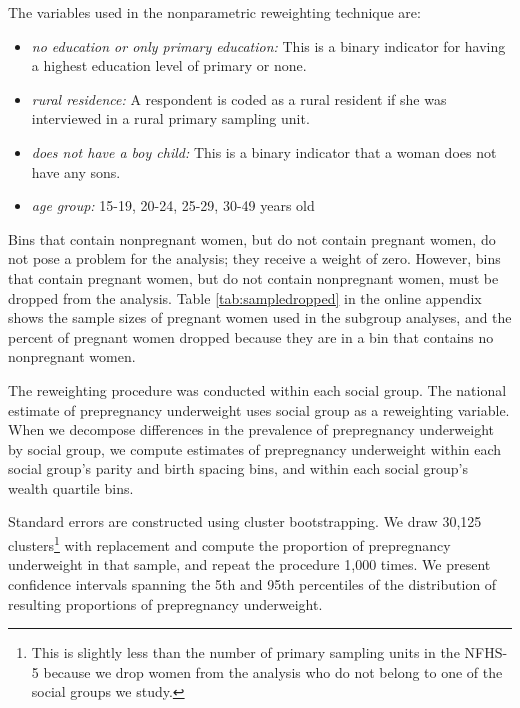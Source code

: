 \documentclass[12pt]{article}
\begin{document}
The variables used in the nonparametric reweighting technique are:
\begin{itemize}
\item \textit{no education or only primary education: } This is a binary indicator for having a highest education level of primary or none. 
\item \textit{rural residence: }
A respondent is coded as a rural resident if she was interviewed in a rural primary sampling unit. 
\item \textit{does not have a boy child: }This is a binary indicator that a woman does not have any sons.
\item \textit{age group:} 15-19, 20-24, 25-29, 30-49 years old

\end{itemize}

Bins that contain nonpregnant women, but do not contain pregnant women, do not pose a problem for the analysis; they receive a weight of zero.  However, bins that contain pregnant women, but do not contain nonpregnant women, must be dropped from the analysis. Table \ref{tab:sampledropped} in the online appendix shows the sample sizes of pregnant women used in the subgroup analyses, and the percent of pregnant women dropped because they are in a bin that contains no nonpregnant women.  

The reweighting procedure was conducted within each social group.  The national estimate of prepregnancy underweight uses social group as a reweighting variable.  When we decompose differences in the prevalence of prepregnancy underweight by social group, we compute estimates of prepregnancy underweight within each social group's parity and birth spacing bins, and within each social group's wealth quartile bins.  

Standard errors are constructed using cluster bootstrapping.  We draw 30,125 clusters\footnote{This is slightly less than the number of primary sampling units in the NFHS-5 because we drop women from the analysis who do not belong to one of the social groups we study.} with replacement and compute the proportion of prepregnancy underweight in that sample, and repeat the procedure 1,000 times.  We present confidence intervals spanning the 5th and 95th percentiles of the distribution of resulting proportions of prepregnancy underweight.
\end{document}

